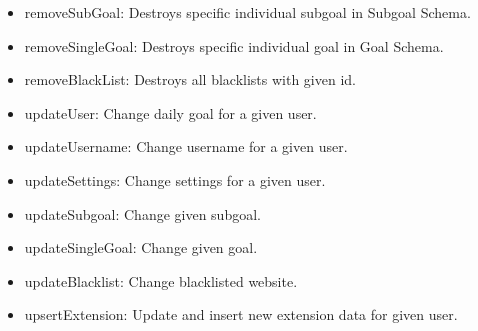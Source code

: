 \documentclass[letterpaper, 10 pt]{report}
\begin{document}
\begin{itemize}
 \item removeSubGoal: Destroys specific individual subgoal in Subgoal Schema.
 \item removeSingleGoal: Destroys specific individual goal in Goal Schema.
 \item removeBlackList: Destroys all blacklists with given id.
 
 \item updateUser: Change daily goal for a given user.
 \item updateUsername: Change username for a given user.
 \item updateSettings: Change settings for a given user.
 \item updateSubgoal: Change given subgoal.
 \item updateSingleGoal: Change given goal.
 \item updateBlacklist: Change blacklisted website.
 \item upsertExtension: Update and insert new extension data for given user.
 
\end{itemize}

\newpage
%

\end{document}
